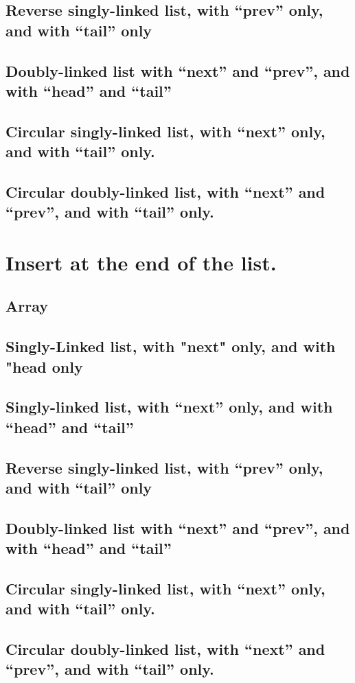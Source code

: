 \documentclass{article}
\begin{document}
\subsection{Reverse singly-linked list, with “prev” only, and with “tail” only}
\subsection{Doubly-linked list with “next” and “prev”, and with “head” and “tail”}
\subsection{Circular singly-linked list, with “next” only, and with “tail” only.}
\subsection{Circular doubly-linked list, with “next” and “prev”, and with “tail” only.}


\section{Insert at the end of the list.}
\subsection{Array}
\subsection{Singly-Linked list, with "next" only, and with "head only}
\subsection{Singly-linked list, with “next” only, and with “head” and “tail”}
\subsection{Reverse singly-linked list, with “prev” only, and with “tail” only}
\subsection{Doubly-linked list with “next” and “prev”, and with “head” and “tail”}
\subsection{Circular singly-linked list, with “next” only, and with “tail” only.}
\subsection{Circular doubly-linked list, with “next” and “prev”, and with “tail” only.}
\end{document}

